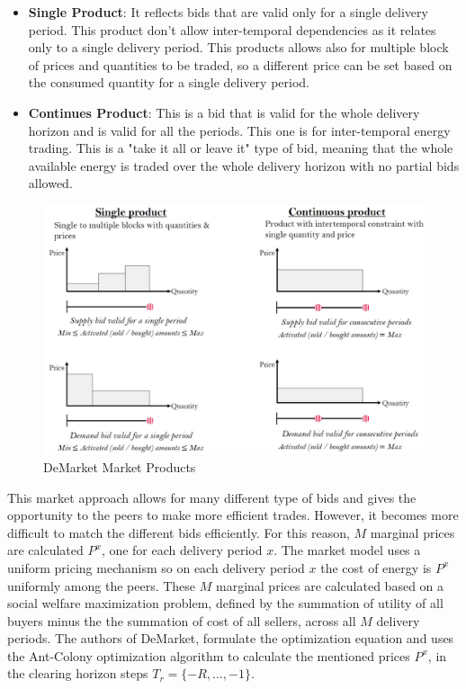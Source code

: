 \begin{itemize}
    \item \textbf{Single Product}: It reflects bids that are valid only for a single delivery period. This product don't allow inter-temporal dependencies as it relates only to a
          single delivery period. This products allows also for multiple block of prices and quantities to be traded, so a different price can be set based on the consumed quantity for
          a single delivery period.
    \item \textbf{Continues Product}: This is a bid that is valid for the whole delivery horizon and is valid for all the periods. This one is for inter-temporal energy trading.
          This is a "take it all or leave it" type of bid, meaning that the whole available energy is traded over the whole delivery horizon with no partial bids allowed. \cite{DeTrade}
\end{itemize}
\begin{figure}[h!]
    \centering
    \includegraphics[scale=0.4]{Figures/DeMarket_Products.png}
    \caption{DeMarket Market Products \cite{DeTrade}}
\end{figure}

This market approach allows for many different type of bids and gives the opportunity to the peers to make more efficient trades. However, it becomes more difficult
to match the different bids efficiently. For this reason, $M$ marginal prices are calculated $P^x$, one for each delivery period $x$. The market model uses a uniform pricing mechanism
so on each delivery period $x$ the cost of energy is $P^x$ uniformly among the peers. These $M$ marginal prices are calculated based on a social welfare maximization problem, defined
by the summation of utility of all buyers minus the the summation of cost of all sellers, across all $M$ delivery periods. The authors of DeMarket, formulate the optimization equation
and uses the Ant-Colony optimization algorithm to calculate the mentioned prices $P^x$, in the clearing horizon steps $T_r = \{-R,\dots,-1\}$.
\cite{DeTrade}


